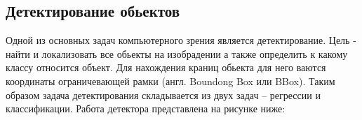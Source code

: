 \subsection{Детектирование обьектов}

Одной из основных задач компьютерного зрения является детектирование. Цель - найти и локализовать все обьекты на изобрадении а также определить к какому классу относится объект. Для нахождения краниц обьекта для него ваются координаты ограничевающей рамки (англ. Boundong Box или BBox). Таким образом задача детектирования складывается из двух задач -- регрессии и классификации. Работа детектора представлена на рисунке ниже:


